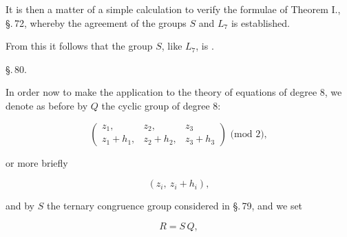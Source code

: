 
It is then a matter of a simple calculation to verify the formulae
of Theorem I., \S.\,72, whereby the agreement
of the groups $S$ and $L_7$ is established.

From this it follows that the group $S$, like $L_7$, is .

\begin{center}
\S.\,80.

\end{center}

In order now to make the application to the theory of equations
of degree 8, we denote as before by $Q$ the
cyclic group of degree 8: %

\[
\begin{pmatrix} z_1, & z_2, & z_3 \\ z_1 + h_1, & z_2 + h_2, & z_3 + h_3 \end{pmatrix} \text{ (mod 2)},
\]

or more briefly

\[
(z_i,\ z_i + h_i),
\]

and by $S$ the ternary congruence group considered in \S.\,79,
and we set

\[
R = S\,Q,
\]
